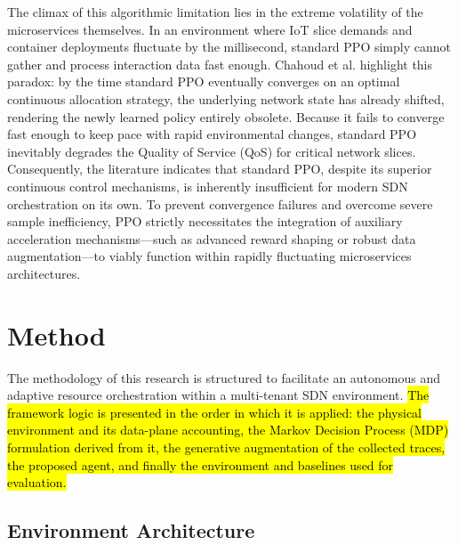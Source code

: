 \documentclass[conference]{IEEEtran}
\newcommand{\rev}[1]{\hl{#1}}
\begin{document}
The climax of this algorithmic limitation lies in the extreme volatility of the microservices themselves. In an environment where IoT slice demands and container deployments fluctuate by the millisecond, standard PPO simply cannot gather and process interaction data fast enough. Chahoud et al. highlight this paradox: by the time standard PPO eventually converges on an optimal continuous allocation strategy, the underlying network state has already shifted, rendering the newly learned policy entirely obsolete\cite{b18}. Because it fails to converge fast enough to keep pace with rapid environmental changes, standard PPO inevitably degrades the Quality of Service (QoS) for critical network slices. Consequently, the literature indicates that standard PPO, despite its superior continuous control mechanisms, is inherently insufficient for modern SDN orchestration on its own. To prevent convergence failures and overcome severe sample inefficiency, PPO strictly necessitates the integration of auxiliary acceleration mechanisms---such as advanced reward shaping or robust data augmentation---to viably function within rapidly fluctuating microservices architectures\cite{b18}.

\section{Method}\label{sec:method}

The methodology of this research is structured to facilitate an autonomous and adaptive resource orchestration within a multi-tenant SDN environment. \rev{The framework logic is presented in the order in which it is applied: the physical environment and its data-plane accounting, the Markov Decision Process (MDP) formulation derived from it, the generative augmentation of the collected traces, the proposed agent, and finally the environment and baselines used for evaluation.}

\subsection{Environment Architecture}\label{sec:env}
\end{document}
